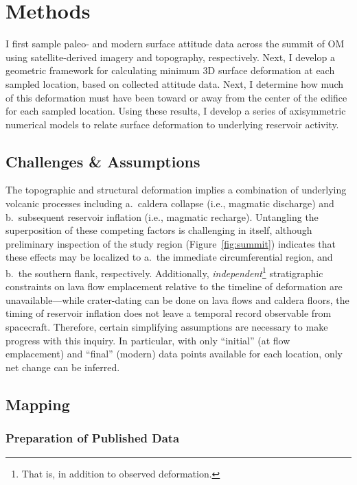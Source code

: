 \chapter{Methods}\label{cha:methods}

I first sample paleo- and modern surface attitude data across the summit of \acl{OM} using satellite-derived imagery and topography, respectively. Next, I develop a geometric framework for calculating minimum 3D surface deformation at each sampled location, based on collected attitude data. Next, I determine how much of this deformation must have been toward or away from the center of the edifice for each sampled location. Using these results, I develop a series of axisymmetric numerical models to relate surface deformation to underlying reservoir activity.

\section{Challenges \& Assumptions}
The topographic and structural deformation implies a combination of underlying volcanic processes including a.\ caldera collapse (i.e., magmatic discharge) and b.\ subsequent reservoir inflation (i.e., magmatic recharge). Untangling the superposition of these competing factors is challenging in itself, although preliminary inspection of the study region (Figure~\ref{fig:summit}) indicates that these effects may be localized to a.\ the immediate circumferential region, and b.\ the southern flank, respectively. Additionally, \textit{independent}\footnote{That is, in addition to observed deformation.} stratigraphic constraints on lava flow emplacement relative to the timeline of deformation are unavailable---while crater-dating can be done on lava flows and caldera floors, the timing of reservoir inflation does not leave a temporal record observable from spacecraft. Therefore, certain simplifying assumptions are necessary to make progress with this inquiry. In particular, with only ``initial'' (at flow emplacement) and ``final'' (modern) data points available for each location, only net change can be inferred.

\section{Mapping}
\subsection{Preparation of Published Data}

